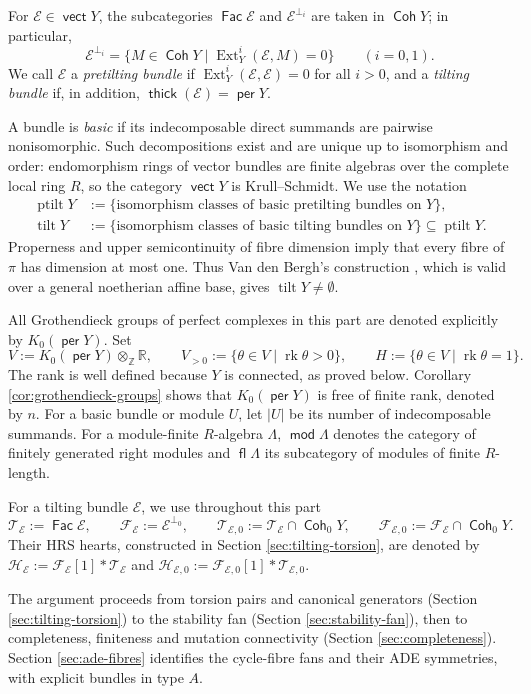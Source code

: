 \documentclass[a4paper,reqno]{amsart}
\def\E{\mathcal{E}}
\def\F{\mathcal{F}}
\def\H{\mathcal{H}}
\def\T{\mathcal{T}}
\def\La{\Lambda}
\DeclareMathOperator{\md}{\mathsf{mod}}
\renewcommand{\mod}{\md}
\DeclareMathOperator{\fl}{\mathsf{fl}}
\DeclareMathOperator{\Fac}{\mathsf{Fac}}
\DeclareMathOperator{\Coh}{\mathsf{Coh}}
\DeclareMathOperator{\vect}{\mathsf{vect}}
\DeclareMathOperator{\per}{\mathsf{per}}
\DeclareMathOperator{\thick}{\mathsf{thick}}
\DeclareMathOperator{\Ext}{Ext}
\DeclareMathOperator{\tilt}{tilt}
\DeclareMathOperator{\ptilt}{ptilt}
\DeclareMathOperator{\rk}{rk}
\theoremstyle{definition}
\begin{document}
For $\E\in\vect Y$, the subcategories $\Fac\E$ and $\E^{\perp_i}$ are taken in $\Coh Y$; in particular,
\[
\E^{\perp_i}=\{M\in\Coh Y\mid\Ext_Y^i(\E,M)=0\}\qquad(i=0,1).
\]
We call $\E$ a \emph{pretilting bundle} if $\Ext_Y^i(\E,\E)=0$ for all $i>0$, and a \emph{tilting bundle} if, in addition, $\thick(\E)=\per Y$.

A bundle is \emph{basic} if its indecomposable direct summands are pairwise nonisomorphic. Such decompositions exist and are unique up to isomorphism and order: endomorphism rings of vector bundles are finite algebras over the complete local ring $R$, so the category $\vect Y$ is Krull--Schmidt. We use the notation
\[
\begin{split}
\ptilt Y&:=\{\text{isomorphism classes of basic pretilting bundles on $Y$}\},\\
\tilt Y&:=\{\text{isomorphism classes of basic tilting bundles on $Y$}\}
\subseteq\ptilt Y.
\end{split}
\]
Properness and upper semicontinuity of fibre dimension imply that every fibre of $\pi$ has dimension at most one. Thus Van den Bergh's construction \cite[Proposition 3.2.5 and Corollary 3.2.8]{VdB04b}, which is valid over a general noetherian affine base, gives $\tilt Y\ne\emptyset$.

All Grothendieck groups of perfect complexes in this part are denoted explicitly by $K_0(\per Y)$. Set
\[
V:=K_0(\per Y)\otimes_{\mathbb Z}\mathbb R,
\qquad V_{>0}:=\{\theta\in V\mid\rk\theta>0\},
\qquad H:=\{\theta\in V\mid\rk\theta=1\}.
\]
The rank is well defined because $Y$ is connected, as proved below. Corollary \ref{cor:grothendieck-groups} shows that $K_0(\per Y)$ is free of finite rank, denoted by $n$. For a basic bundle or module $U$, let $|U|$ be its number of indecomposable summands. For a module-finite $R$-algebra $\La$, $\mod\La$ denotes the category of finitely generated right modules and $\fl\La$ its subcategory of modules of finite $R$-length.

For a tilting bundle $\E$, we use throughout this part
\[
\T_\E:=\Fac\E,\qquad\F_\E:=\E^{\perp_0},\qquad
\T_{\E,0}:=\T_\E\cap\Coh_0Y,\qquad\F_{\E,0}:=\F_\E\cap\Coh_0Y.
\]
Their HRS hearts, constructed in Section \ref{sec:tilting-torsion}, are denoted by $\H_\E:=\F_\E[1]*\T_\E$ and $\H_{\E,0}:=\F_{\E,0}[1]*\T_{\E,0}$.

The argument proceeds from torsion pairs and canonical generators (Section \ref{sec:tilting-torsion}) to the stability fan (Section \ref{sec:stability-fan}), then to completeness, finiteness and mutation connectivity (Section \ref{sec:completeness}). Section \ref{sec:ade-fibres} identifies the cycle-fibre fans and their ADE symmetries, with explicit bundles in type $A$.
\end{document}
